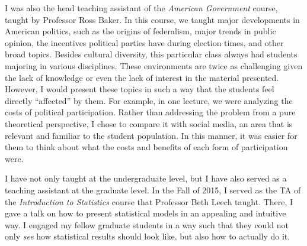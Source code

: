 I was also the head teaching assistant of the \emph{American Government} course, taught by Professor Ross Baker. In this course, we taught major developments in American politics, such as the origins of federalism, major trends in public opinion, the incentives political parties have during election times, and other broad topics. Besides cultural diversity, this particular class always had students majoring in various disciplines. These environments are twice as challenging given the lack of knowledge or even the lack of interest in the material presented. However, I would present these topics in such a way that the students feel directly ``affected'' by them. For example, in one lecture, we were analyzing the costs of political participation. Rather than addressing the problem from a pure theoretical perspective, I chose to compare it with social media, an area that is relevant and familiar to the student population. In this manner, it was easier for them to think about what the costs and benefits of each form of participation were. 

I have not only taught at the undergraduate level, but I have also served as a teaching assistant at the graduate level. In the Fall of 2015, I served as the TA of the \emph{Introduction to Statistics} course that Professor Beth Leech taught. There, I gave a talk on how to present statistical models in an appealing and intuitive way. I engaged my fellow graduate students in a way such that they could not only \emph{see} how statistical results should look like, but also how to actually do it. 

